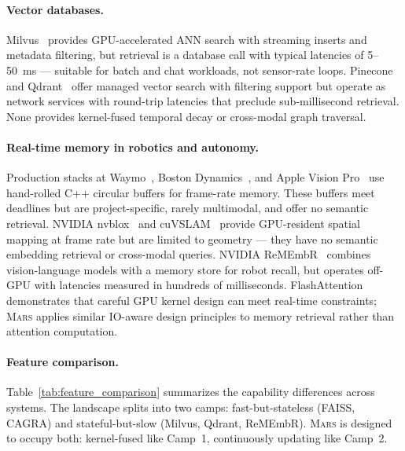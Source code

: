 \documentclass[11pt]{article}
\newcommand{\mars}{\textsc{Mars}}
\begin{document}
\paragraph{Vector databases.}
Milvus~\cite{milvus} provides GPU-accelerated ANN search with streaming
inserts and metadata filtering, but retrieval is a database call with
typical latencies of 5--50~ms --- suitable for batch and chat workloads,
not sensor-rate loops. Pinecone~\cite{pinecone} and
Qdrant~\cite{qdrant} offer managed vector search with filtering support
but operate as network services with round-trip latencies that preclude
sub-millisecond retrieval. None provides kernel-fused temporal decay or
cross-modal graph traversal.

\paragraph{Real-time memory in robotics and autonomy.}
Production stacks at Waymo~\cite{waymo2020}, Boston
Dynamics~\cite{atlasctrl}, and Apple Vision Pro~\cite{visionpro} use
hand-rolled C++ circular buffers for frame-rate memory. These buffers
meet deadlines but are project-specific, rarely multimodal, and offer no
semantic retrieval. NVIDIA nvblox~\cite{nvblox} and
cuVSLAM~\cite{cuVSLAM} provide GPU-resident spatial mapping at frame
rate but are limited to geometry --- they have no semantic embedding
retrieval or cross-modal queries. NVIDIA
ReMEmbR~\cite{remembr} combines vision-language models with a memory
store for robot recall, but operates off-GPU with latencies measured in
hundreds of milliseconds. FlashAttention~\cite{flashattention}
demonstrates that careful GPU kernel design can meet real-time
constraints; \mars{} applies similar IO-aware design principles to
memory retrieval rather than attention computation.

\paragraph{Feature comparison.}
Table~\ref{tab:feature_comparison} summarizes the capability differences
across systems. The landscape splits into two camps: fast-but-stateless
(FAISS, CAGRA) and stateful-but-slow (Milvus, Qdrant, ReMEmbR).
\mars{} is designed to occupy both: kernel-fused like Camp~1,
continuously updating like Camp~2.
\end{document}
